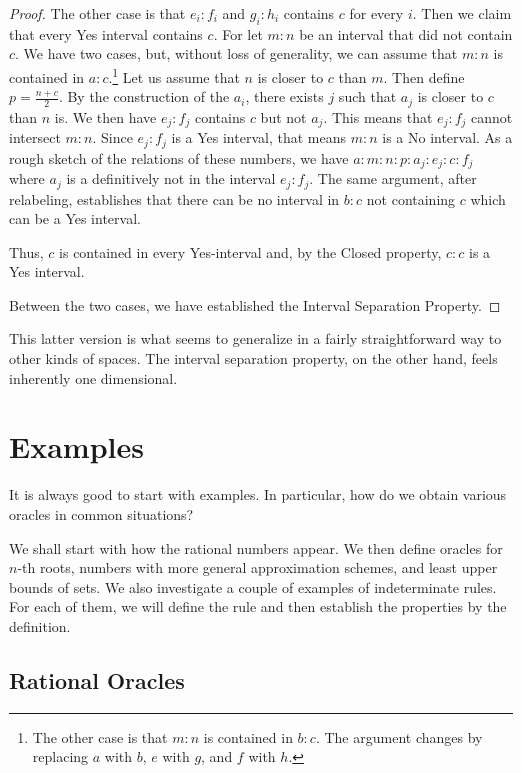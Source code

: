 \documentclass[12pt]{article}
\theoremstyle{remark}
\begin{document}
\begin{proof}
    The other case is that $e_i:f_i$ and $g_i:h_i$ contains $c$ for every $i$. Then we claim that every Yes interval contains $c$. For let $m:n$ be an interval that did not contain $c$. We have two cases, but, without loss of generality, we can assume that $m:n$ is contained in $a:c$.\footnote{The other case is that $m:n$ is contained in $b:c$. The argument changes by replacing $a$ with $b$, $e$ with $g$, and $f$ with $h$.} Let us assume that $n$ is closer to $c$ than $m$. Then define $p =\frac{n+c}{2}$. By the construction of the $a_i$, there exists $j$ such that $a_j$ is closer to $c$ than $n$ is. We then have $e_j:f_j$ contains $c$ but not $a_j$. This means that $e_j:f_j$ cannot intersect $m:n$. Since $e_j:f_j$ is a Yes interval, that means $m:n$ is a No interval. As a rough sketch of the relations of these numbers, we have $a:m:n:p:a_j:e_j:c:f_j$ where $a_j$ is a definitively not in the interval $e_j:f_j$. The same argument, after relabeling, establishes that there can be no interval in $b:c$ not containing $c$ which can be a Yes interval. 

    Thus, $c$ is contained in every Yes-interval and, by the Closed property, $c:c$ is a Yes interval. 

    Between the two cases, we have established the Interval Separation Property. 
\end{proof}

This latter version is what seems to generalize in a fairly straightforward way to other kinds of spaces. The interval separation property, on the other hand, feels inherently one dimensional. 

\section{Examples}

It is always good to start with examples. In particular, how do we obtain various oracles in common situations? 

We shall start with how the rational numbers appear. We then define oracles for $n$-th roots,  numbers with more general approximation schemes, and least upper bounds of sets. We also investigate a couple of examples of indeterminate rules. For each of them, we will define the rule and then establish the properties by the definition. 

\subsection{Rational Oracles}
\end{document}

